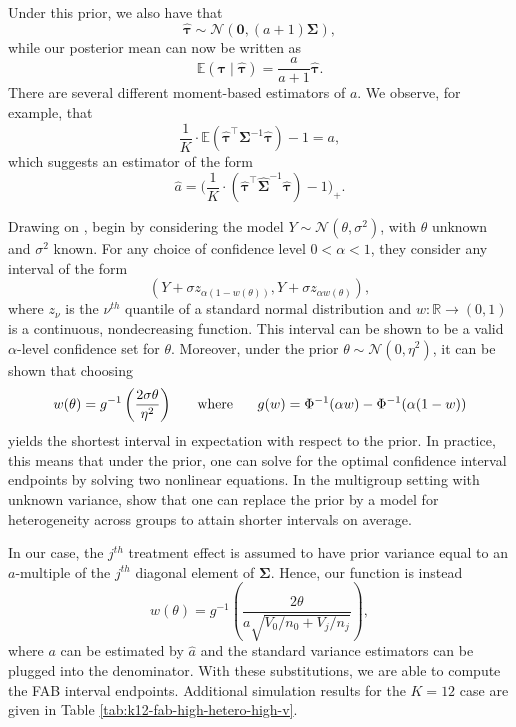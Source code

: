 \documentclass{article}
\newcommand{\bstau}{\boldsymbol \tau}
\newcommand{\hbstau}{\boldsymbol{\hat \tau}}
\newcommand{\bsSig}{\boldsymbol  \Sigma}
\def\e{\mathbb{E}}
\newcommand{\hbsSig}{ \boldsymbol{\hat \Sigma}}
\begin{document}
Under this prior, we also have that 
\[ \hbstau \sim \mathcal{N} \left( \boldsymbol 0, (a + 1) \bsSig \right), \]
while our posterior mean can now be written as 
\[ \e \left( \bstau \mid \hbstau \right) = \frac{a}{a + 1} \hbstau.\]
There are several different moment-based estimators of $a$. We observe, for example, that 
\[ \frac{1}{K} \cdot \e \left( \hbstau^\top \bsSig^{-1} \hbstau \right) - 1 = a,\]
which suggests an estimator of the form
\[ \hat a = \bigg(\frac{1}{K} \cdot \left( \hbstau^\top \hbsSig^{-1} \hbstau \right) - 1\bigg)_+.  \]

Drawing on \cite{pratt1963shorter}, \cite{yu_hoff_2018} begin by considering the model $Y \sim \mathcal{N}(\theta, \sigma^2)$, with $\theta$ unknown and $\sigma^2$ known. For any choice of confidence level $0 < \alpha < 1$, they consider any interval of the form 
\[ \left( Y + \sigma z_{\alpha (1 - w(\theta))}, Y + \sigma z_{\alpha w(\theta)} \right),\]
where $z_\nu$ is the $\nu^{th}$ quantile of a standard normal distribution and $w: \mathbb{R} \to (0, 1)$ is a continuous, nondecreasing function. This interval can be shown to be a valid $\alpha$-level confidence set for $\theta$. Moreover, under the prior $\theta \sim \mathcal{N}(0, \eta^2)$, it can be shown that choosing
\[ w(\theta) = g^{-1} \left( \frac{2 \sigma \theta}{\eta^2} \right) \hspace{5mm} \text{ where } \hspace{5mm} g(w) = \Phi^{-1}(\alpha w) - \Phi^{-1}(\alpha(1 - w)) \]
yields the shortest interval in expectation with respect to the prior. In practice, this means that under the prior, one can solve for the optimal confidence interval endpoints by solving two nonlinear equations. In the multigroup setting with unknown variance, \cite{yu_hoff_2018} show that one can replace the prior by a model for heterogeneity across groups to attain shorter intervals on average.

In our case, the $j^{th}$ treatment effect is assumed to have prior variance equal to an $a$-multiple of the $j^{th}$ diagonal element of $\bsSig$. Hence, our function is instead 
\[ w(\theta) = g^{-1} \left(\frac{2 \theta }{a \sqrt{V_0/n_0 + V_j/n_j}}\right), \]
where $a$ can be estimated by $\hat a$ and the standard variance estimators can be plugged into the denominator. With these substitutions, we are able to compute the FAB interval endpoints. Additional simulation results for the $K = 12$ case are given in Table \ref{tab:k12-fab-high-hetero-high-v}. 
\end{document}
